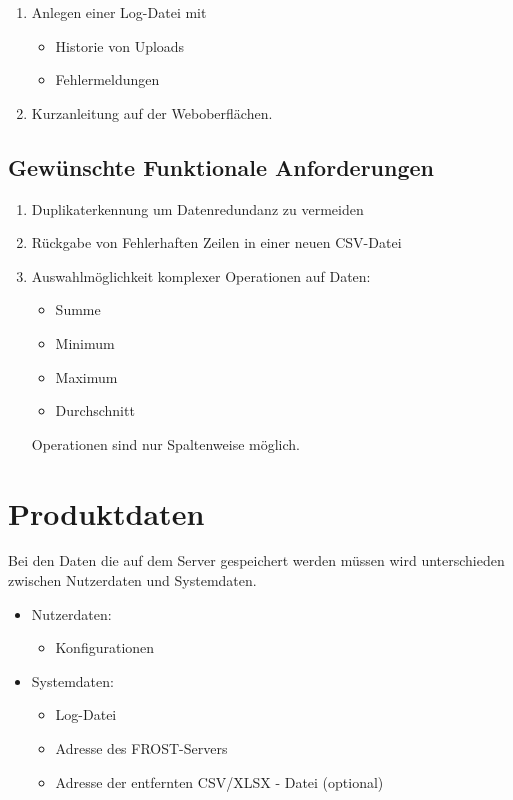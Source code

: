 \documentclass[a4paper, 12 pt]{article}
\begin{document}
\begin{enumerate}
		\item Anlegen einer Log-Datei mit
		\begin{itemize}
			\item Historie von Uploads
			\item Fehlermeldungen
		\end{itemize}
		
		\item Kurzanleitung auf der Weboberflächen.
	\end{enumerate}
	
	\subsection{Gewünschte Funktionale Anforderungen}
	\begin{enumerate}
		\item Duplikaterkennung um Datenredundanz zu vermeiden
		
		\item Rückgabe von Fehlerhaften Zeilen in einer neuen CSV-Datei
		
		\item Auswahlmöglichkeit komplexer Operationen auf Daten:
		\begin{itemize}
			\item Summe
			\item Minimum
			\item Maximum
			\item Durchschnitt
		\end{itemize}
		Operationen sind nur Spaltenweise  möglich. 
	\end{enumerate}

	\section{Produktdaten}
	
	Bei den Daten die auf dem Server gespeichert werden müssen wird unterschieden zwischen Nutzerdaten und Systemdaten.
	
\begin{itemize}
	\item Nutzerdaten:
	\begin{itemize}
		\item Konfigurationen
	\end{itemize}
	\item Systemdaten:
	\begin{itemize}
		\item Log-Datei
		\item Adresse des FROST-Servers
		\item Adresse der entfernten CSV/XLSX - Datei (optional) 
	\end{itemize}
\end{itemize}
	
\end{document}
